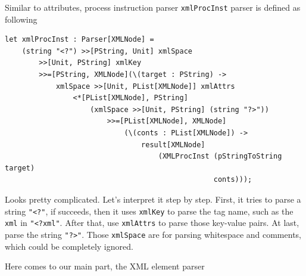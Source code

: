 Similar to attributes, process instruction parser \texttt{xmlProcInst} parser is defined as following

\begin{lstlisting}
let xmlProcInst : Parser[XMLNode] =
    (string "<?") >>[PString, Unit] xmlSpace
        >>[Unit, PString] xmlKey
        >>=[PString, XMLNode](\(target : PString) ->
            xmlSpace >>[Unit, PList[XMLNode]] xmlAttrs
                <*[PList[XMLNode], PString]
                    (xmlSpace >>[Unit, PString] (string "?>"))
                        >>=[PList[XMLNode], XMLNode]
                            (\(conts : PList[XMLNode]) ->
                                result[XMLNode]
                                    (XMLProcInst (pStringToString target)
                                                 conts)));
\end{lstlisting}

Looks pretty complicated. Let's interpret it step by step. First, it tries to parse a string \texttt{"\textless?"}, if succeeds, then it uses \texttt{xmlKey} to parse the tag name, such as the \texttt{xml} in \texttt{"\textless?xml"}. After that, use \texttt{xmlAttrs} to parse those key-value pairs. At last, parse the string \texttt{"?\textgreater"}. Those \texttt{xmlSpace} are for parsing whitespace and comments, which could be completely ignored.

Here comes to our main part, the XML element parser

